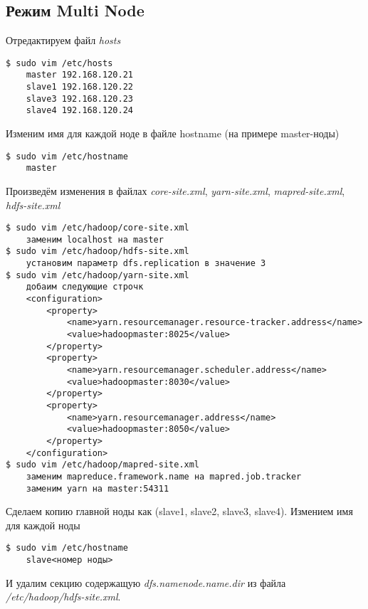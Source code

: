 \subsection{Режим Multi Node}
Отредактируем файл \emph{hosts}
\begin{lstlisting}
$ sudo vim /etc/hosts
    master 192.168.120.21
    slave1 192.168.120.22
    slave3 192.168.120.23
    slave4 192.168.120.24
\end{lstlisting}
Изменим имя для каждой ноде в файле hostname (на примере master-ноды)
\begin{lstlisting}
$ sudo vim /etc/hostname
    master
\end{lstlisting}
Произведём изменения в файлах \emph{core-site.xml}, \emph{yarn-site.xml}, \emph{mapred-site.xml}, \emph{hdfs-site.xml}
\begin{lstlisting}
$ sudo vim /etc/hadoop/core-site.xml
    заменим localhost на master
$ sudo vim /etc/hadoop/hdfs-site.xml
    установим параметр dfs.replication в значение 3
$ sudo vim /etc/hadoop/yarn-site.xml
    добаим следующие строчк
    <configuration>
        <property>
            <name>yarn.resourcemanager.resource-tracker.address</name>
            <value>hadoopmaster:8025</value>
        </property>
        <property>
            <name>yarn.resourcemanager.scheduler.address</name>
            <value>hadoopmaster:8030</value>
        </property>
        <property>
            <name>yarn.resourcemanager.address</name>
            <value>hadoopmaster:8050</value>
        </property>
    </configuration>
$ sudo vim /etc/hadoop/mapred-site.xml
    заменим mapreduce.framework.name на mapred.job.tracker
    заменим yarn на master:54311
\end{lstlisting}
Сделаем копию главной ноды как (slave1, slave2, slave3, slave4). Измением имя для каждой ноды
\begin{lstlisting}
$ sudo vim /etc/hostname
    slave<номер ноды>
\end{lstlisting}
И удалим секцию содержащую \emph{dfs.namenode.name.dir} из файла \emph{/etc/hadoop/hdfs-site.xml}.

